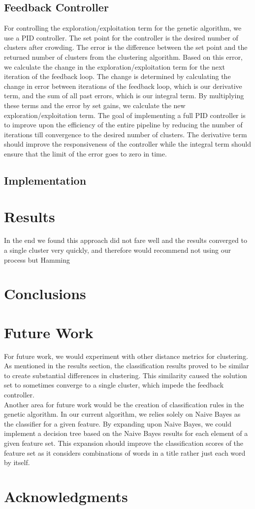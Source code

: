 \documentclass{sig-alternate}
\begin{document}
\subsection{Feedback Controller}
For controlling the exploration/exploitation term for the genetic algorithm, we use a PID controller. The set point for the controller is the desired number of clusters after crowding. The error is the difference between the set point and the returned number of clusters from the clustering algorithm. Based on this error, we calculate the change in the exploration/exploitation term for the next iteration of the feedback loop. The change is determined by calculating the change in error between iterations of the feedback loop, which is our derivative term, and the sum of all past errors, which is our integral term. By multiplying these terms and the error by set gains, we calculate the new exploration/exploitation term. The goal of implementing a full PID controller is to improve upon the efficiency of the entire pipeline by reducing the number of iterations till convergence to the desired number of clusters. The derivative term should improve the responsiveness of the controller while the integral term should ensure that the limit of the error goes to zero in time.

\subsection{Implementation}

\section{Results}
In the end we found this approach did not fare well and the results converged to a single cluster very quickly, and therefore would recommend not using our process but Hamming

\section{Conclusions}

\section{Future Work}
For future work, we would experiment with other distance metrics for clustering. As mentioned in the results section, the classification results proved to be similar to create substantial differences in clustering. This similarity caused the solution set to sometimes converge to a single cluster, which impede the feedback controller.\\
\indent Another area for future work would be the creation of classification rules in the genetic algorithm. In our current algorithm, we relies solely on Naive Bayes as the classifier for a given feature. By expanding upon Naive Bayes, we could implement a decision tree based on the Naive Bayes results for each element of a given feature set. This expansion should improve the classification scores of the feature set as it considers combinations of words in a title rather just each word by itself.

\section{Acknowledgments}



\end{document}
